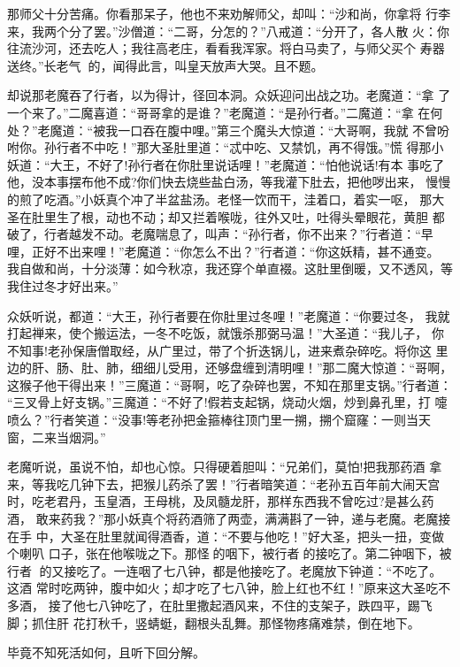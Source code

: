 那师父十分苦痛。你看那呆子，他也不来劝解师父，却叫：“沙和尚，你拿将
行李来，我两个分了罢。”沙僧道：“二哥，分怎的？”八戒道：“分开了，各人散
火：你往流沙河，还去吃人；我往高老庄，看看我浑家。将白马卖了，与师父买个
寿器送终。”长老气的，闻得此言，叫皇天放声大哭。且不题。

却说那老魔吞了行者，以为得计，径回本洞。众妖迎问出战之功。老魔道：“拿
了一个来了。”二魔喜道：“哥哥拿的是谁？”老魔道：“是孙行者。”二魔道：“拿
在何处？”老魔道：“被我一口吞在腹中哩。”第三个魔头大惊道：“大哥啊，我就
不曾吩咐你。孙行者不中吃！”那大圣肚里道：“忒中吃、又禁饥，再不得饿。”慌
得那小妖道：“大王，不好了!孙行者在你肚里说话哩！”老魔道：“怕他说话!有本
事吃了他，没本事摆布他不成?你们快去烧些盐白汤，等我灌下肚去，把他哕出来，
慢慢的煎了吃酒。”小妖真个冲了半盆盐汤。老怪一饮而干，洼着口，着实一呕，
那大圣在肚里生了根，动也不动；却又拦着喉咙，往外又吐，吐得头晕眼花，黄胆
都破了，行者越发不动。老魔喘息了，叫声：“孙行者，你不出来？”行者道：“早
哩，正好不出来哩！”老魔道：“你怎么不出？”行者道：“你这妖精，甚不通变。
我自做和尚，十分淡薄：如今秋凉，我还穿个单直裰。这肚里倒暖，又不透风，等
我住过冬才好出来。”

众妖听说，都道：“大王，孙行者要在你肚里过冬哩！”老魔道：“你要过冬，
我就打起禅来，使个搬运法，一冬不吃饭，就饿杀那弼马温！”大圣道：“我儿子，
你不知事!老孙保唐僧取经，从广里过，带了个折迭锅儿，进来煮杂碎吃。将你这
里边的肝、肠、肚、肺，细细儿受用，还够盘缠到清明哩！”那二魔大惊道：“哥啊，
这猴子他干得出来！”三魔道：“哥啊，吃了杂碎也罢，不知在那里支锅。”行者道：
“三叉骨上好支锅。”三魔道：“不好了!假若支起锅，烧动火烟，炒到鼻孔里，打
嚏喷么？”行者笑道：“没事!等老孙把金箍棒往顶门里一搠，搠个窟窿：一则当天
窗，二来当烟洞。”

老魔听说，虽说不怕，却也心惊。只得硬着胆叫：“兄弟们，莫怕!把我那药酒
拿来，等我吃几钟下去，把猴儿药杀了罢！”行者暗笑道：“老孙五百年前大闹天宫
时，吃老君丹，玉皇酒，王母桃，及凤髓龙肝，那样东西我不曾吃过?是甚么药酒，
敢来药我？”那小妖真个将药酒筛了两壶，满满斟了一钟，递与老魔。老魔接在手
中，大圣在肚里就闻得酒香，道：“不要与他吃！”好大圣，把头一扭，变做个喇叭
口子，张在他喉咙之下。那怪的咽下，被行者的接吃了。第二钟咽下，被行者
的又接吃了。一连咽了七八钟，都是他接吃了。老魔放下钟道：“不吃了。这酒
常时吃两钟，腹中如火；却才吃了七八钟，脸上红也不红！”原来这大圣吃不多酒，
接了他七八钟吃了，在肚里撒起酒风来，不住的支架子，跌四平，踢飞脚；抓住肝
花打秋千，竖蜻蜓，翻根头乱舞。那怪物疼痛难禁，倒在地下。

毕竟不知死活如何，且听下回分解。